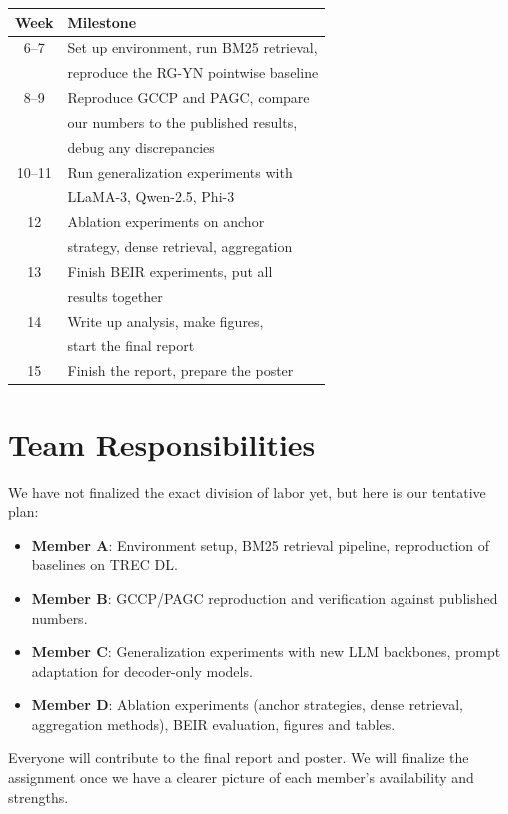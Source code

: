 \documentclass[conference]{IEEEtran}
\begin{document}
\begin{table}[h]
\centering
\small
\begin{tabular}{@{}cl@{}}
\toprule
\textbf{Week} & \textbf{Milestone} \\
\midrule
6--7 & Set up environment, run BM25 retrieval, \\
     & reproduce the RG-YN pointwise baseline \\
8--9 & Reproduce GCCP and PAGC, compare \\
     & our numbers to the published results, \\
     & debug any discrepancies \\
10--11 & Run generalization experiments with \\
      & LLaMA-3, Qwen-2.5, Phi-3 \\
12   & Ablation experiments on anchor \\
     & strategy, dense retrieval, aggregation \\
13   & Finish BEIR experiments, put all \\
     & results together \\
14   & Write up analysis, make figures, \\
     & start the final report \\
15   & Finish the report, prepare the poster \\
\bottomrule
\end{tabular}
\end{table}

\section{Team Responsibilities}

We have not finalized the exact division of labor yet, but here is our tentative plan:

\begin{itemize}[nosep,leftmargin=1em]
    \item \textbf{Member A}: Environment setup, BM25 retrieval pipeline, reproduction of baselines on TREC DL.
    \item \textbf{Member B}: GCCP/PAGC reproduction and verification against published numbers.
    \item \textbf{Member C}: Generalization experiments with new LLM backbones, prompt adaptation for decoder-only models.
    \item \textbf{Member D}: Ablation experiments (anchor strategies, dense retrieval, aggregation methods), BEIR evaluation, figures and tables.
\end{itemize}

Everyone will contribute to the final report and poster. We will finalize the assignment once we have a clearer picture of each member's availability and strengths.



\end{document}
